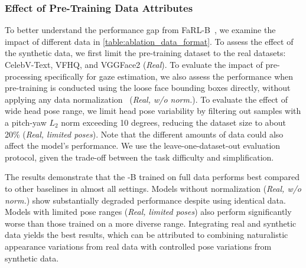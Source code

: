\subsubsection{Effect of Pre-Training Data Attributes}
To better understand the performance gap from FaRL-B~\cite{zheng2022general}, we examine the impact of different data in \cref{table:ablation_data_format}.
To assess the effect of the synthetic data, we first limit the pre-training dataset to the real datasets: CelebV-Text, VFHQ, and VGGFace2 (\textit{Real}).
To evaluate the impact of pre-processing specifically for gaze estimation, we also assess the performance when pre-training is conducted using the loose face bounding boxes directly, without applying any data normalization~\cite{zhang2018revisiting} (\textit{Real, w/o norm.}).
To evaluate the effect of wide head pose range, we limit head pose variability by filtering out samples with a pitch-yaw $L_2$ norm exceeding 10 degrees, reducing the dataset size to about 20\% (\textit{Real, limited poses}). 
Note that the different amounts of data could also affect the model's performance.
We use the leave-one-dataset-out evaluation protocol, given the trade-off between the task difficulty and simplification.


The results demonstrate that the \methodname-B trained on full data performs best compared to other baselines in almost all settings.
Models without normalization (\textit{Real, w/o norm.}) show substantially degraded performance despite using identical data.
Models with limited pose ranges (\textit{Real, limited poses}) also perform significantly worse than those trained on a more diverse range.
Integrating real and synthetic data yields the best results, which can be attributed to combining naturalistic appearance variations from real data with controlled pose variations from synthetic data.



